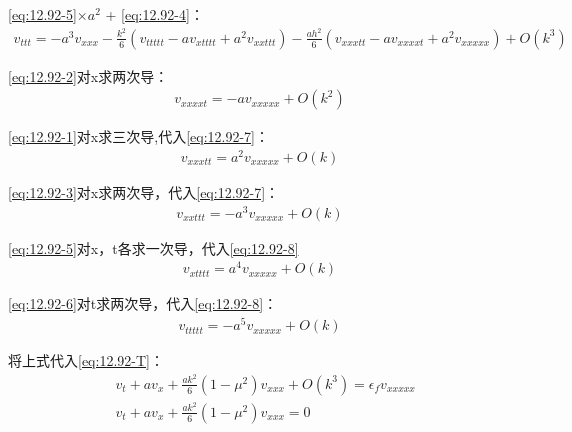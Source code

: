 \documentclass[UTF8]{ctexart}
\begin{document}
\eqref{eq:12.92-5}$\times a^2$ + \eqref{eq:12.92-4}：
\begin{equation}
    \label{eq:12.92-6}
    \begin{aligned}
        v_{ttt} = -a^3v_{xxx} - \frac{k^2}{6}(v_{ttttt} -av_{xtttt}+a^2v_{xxttt})-\frac{ah^2}{6}(v_{xxxtt}-av_{xxxxt}+a^2v_{xxxxx}) + O(k^3)
    \end{aligned}
\end{equation}

\eqref{eq:12.92-2}对x求两次导：
\begin{equation}
    \label{eq:12.92-7}
    \begin{aligned}
        v_{xxxxt} = -av_{xxxxx} + O(k^2)
    \end{aligned}
\end{equation}

\eqref{eq:12.92-1}对x求三次导,代入\eqref{eq:12.92-7}：
\begin{equation}
    \label{eq:12.92-8}
    \begin{aligned}
        v_{xxxtt} = a^2v_{xxxxx} + O(k)
    \end{aligned}
\end{equation}

\eqref{eq:12.92-3}对x求两次导，代入\eqref{eq:12.92-7}：
\begin{equation}
    \label{eq:12.92-9}
    \begin{aligned}
        v_{xxttt} = -a^3v_{xxxxx} + O(k)
    \end{aligned}
\end{equation}

\eqref{eq:12.92-5}对x，t各求一次导，代入\eqref{eq:12.92-8}
\begin{equation}
    \label{eq:12.92-10}
    \begin{aligned}
        v_{xtttt} = a^4v_{xxxxx} + O(k)
    \end{aligned}
\end{equation}

\eqref{eq:12.92-6}对t求两次导，代入\eqref{eq:12.92-8}：
\begin{equation}
    \label{eq:12.92-11}
    \begin{aligned}
        v_{ttttt} = -a^5v_{xxxxx} + O(k)
    \end{aligned}
\end{equation}

将上式代入\eqref{eq:12.92-T}：
\begin{equation}
    \label{eq:12.92-12}
    \begin{aligned}
        &v_t + av_x + \frac{ak^2}{6}(1-\mu^2)v_{xxx}+O(k^3) =\epsilon_fv_{xxxxx} \\
        &v_t + av_x + \frac{ak^2}{6}(1-\mu^2)v_{xxx} = 0
    \end{aligned}
\end{equation}
\end{document}
